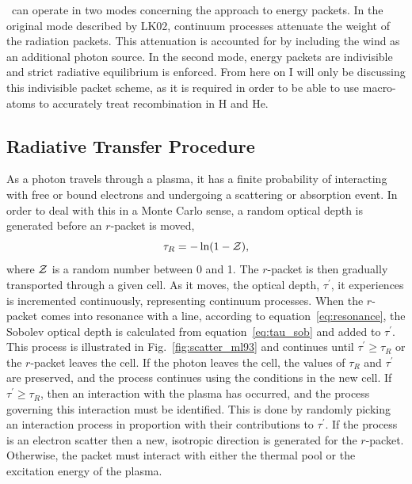 \py\ can operate in two modes concerning the approach to energy packets. 
In the original mode described by LK02, continuum processes attenuate 
the weight of the radiation packets. This attenuation is accounted for 
by including the wind as an additional photon source.
In the second mode, energy packets are indivisible and strict radiative equilibrium is
enforced. From here on I will only be discussing this indivisible packet scheme, 
as it is required in order to be able to use macro-atoms to accurately
treat recombination in H and He. 

\subsection{Radiative Transfer Procedure}

\label{sec:rt_procedure}
As a photon travels through a plasma, it has a finite probability
of interacting with free or bound electrons and undergoing a scattering
or absorption event. In order to deal with this in a Monte Carlo sense, a random optical 
depth is generated before an $r$-packet is moved,
\begin{equation}
\tau_R = - \ln (1 - {\cal Z}),
\end{equation}
where ${\cal Z}$ is a random number between 0 and 1. 
The $r$-packet is then gradually transported through a given cell. 
As it moves, the optical depth, $\tau^\prime$, it experiences
is incremented continuously, representing continuum processes. When the $r$-packet comes
into resonance with a line, according to equation~\ref{eq:resonance},
the Sobolev optical depth is calculated from equation~\ref{eq:tau_sob} and added to 
$\tau^\prime$. This process is illustrated in Fig.~\ref{fig:scatter_ml93} and
continues until $\tau^\prime \geq \tau_R$ or the $r$-packet leaves the cell. If the
photon leaves the cell, the values of $\tau_R$ and $\tau^\prime$ are preserved,
and the process continues using the conditions in the new cell. If 
$\tau^\prime \geq \tau_R$, then an interaction with the plasma has occurred, and
the process governing this interaction must be identified. This is done by
randomly picking an interaction process in proportion with their contributions
to $\tau^\prime$. If the process is an electron scatter then a new, isotropic
direction is generated for the $r$-packet. Otherwise, the packet must
interact with either the thermal pool or the excitation energy of the plasma.

